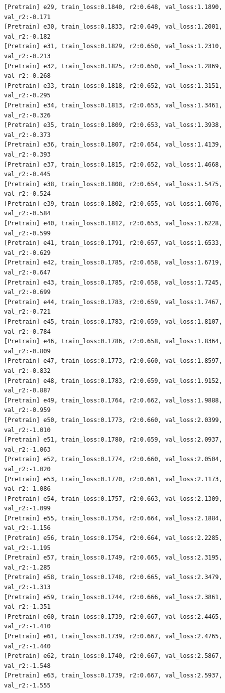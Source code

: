 \documentclass[a4paper, 12pt]{article}
\begin{document}
\begin{lstlisting}
[Pretrain] e29, train_loss:0.1840, r2:0.648, val_loss:1.1890, val_r2:-0.171
[Pretrain] e30, train_loss:0.1833, r2:0.649, val_loss:1.2001, val_r2:-0.182
[Pretrain] e31, train_loss:0.1829, r2:0.650, val_loss:1.2310, val_r2:-0.213
[Pretrain] e32, train_loss:0.1825, r2:0.650, val_loss:1.2869, val_r2:-0.268
[Pretrain] e33, train_loss:0.1818, r2:0.652, val_loss:1.3151, val_r2:-0.295
[Pretrain] e34, train_loss:0.1813, r2:0.653, val_loss:1.3461, val_r2:-0.326
[Pretrain] e35, train_loss:0.1809, r2:0.653, val_loss:1.3938, val_r2:-0.373
[Pretrain] e36, train_loss:0.1807, r2:0.654, val_loss:1.4139, val_r2:-0.393
[Pretrain] e37, train_loss:0.1815, r2:0.652, val_loss:1.4668, val_r2:-0.445
[Pretrain] e38, train_loss:0.1808, r2:0.654, val_loss:1.5475, val_r2:-0.524
[Pretrain] e39, train_loss:0.1802, r2:0.655, val_loss:1.6076, val_r2:-0.584
[Pretrain] e40, train_loss:0.1812, r2:0.653, val_loss:1.6228, val_r2:-0.599
[Pretrain] e41, train_loss:0.1791, r2:0.657, val_loss:1.6533, val_r2:-0.629
[Pretrain] e42, train_loss:0.1785, r2:0.658, val_loss:1.6719, val_r2:-0.647
[Pretrain] e43, train_loss:0.1785, r2:0.658, val_loss:1.7245, val_r2:-0.699
[Pretrain] e44, train_loss:0.1783, r2:0.659, val_loss:1.7467, val_r2:-0.721
[Pretrain] e45, train_loss:0.1783, r2:0.659, val_loss:1.8107, val_r2:-0.784
[Pretrain] e46, train_loss:0.1786, r2:0.658, val_loss:1.8364, val_r2:-0.809
[Pretrain] e47, train_loss:0.1773, r2:0.660, val_loss:1.8597, val_r2:-0.832
[Pretrain] e48, train_loss:0.1783, r2:0.659, val_loss:1.9152, val_r2:-0.887
[Pretrain] e49, train_loss:0.1764, r2:0.662, val_loss:1.9888, val_r2:-0.959
[Pretrain] e50, train_loss:0.1773, r2:0.660, val_loss:2.0399, val_r2:-1.010
[Pretrain] e51, train_loss:0.1780, r2:0.659, val_loss:2.0937, val_r2:-1.063
[Pretrain] e52, train_loss:0.1774, r2:0.660, val_loss:2.0504, val_r2:-1.020
[Pretrain] e53, train_loss:0.1770, r2:0.661, val_loss:2.1173, val_r2:-1.086
[Pretrain] e54, train_loss:0.1757, r2:0.663, val_loss:2.1309, val_r2:-1.099
[Pretrain] e55, train_loss:0.1754, r2:0.664, val_loss:2.1884, val_r2:-1.156
[Pretrain] e56, train_loss:0.1754, r2:0.664, val_loss:2.2285, val_r2:-1.195
[Pretrain] e57, train_loss:0.1749, r2:0.665, val_loss:2.3195, val_r2:-1.285
[Pretrain] e58, train_loss:0.1748, r2:0.665, val_loss:2.3479, val_r2:-1.313
[Pretrain] e59, train_loss:0.1744, r2:0.666, val_loss:2.3861, val_r2:-1.351
[Pretrain] e60, train_loss:0.1739, r2:0.667, val_loss:2.4465, val_r2:-1.410
[Pretrain] e61, train_loss:0.1739, r2:0.667, val_loss:2.4765, val_r2:-1.440
[Pretrain] e62, train_loss:0.1740, r2:0.667, val_loss:2.5867, val_r2:-1.548
[Pretrain] e63, train_loss:0.1739, r2:0.667, val_loss:2.5937, val_r2:-1.555

\end{lstlisting}
\end{document}
